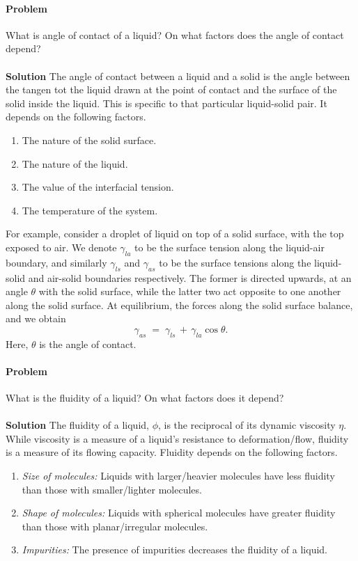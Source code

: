 \documentclass[10pt]{article}
\newcounter{prob}
\def\problem{\stepcounter{prob}\paragraph{Problem \arabic{prob}}}
\def\solution{\\\\\textbf{Solution }}
\begin{document}
        \problem What is angle of contact of a liquid? On what factors does the angle of contact depend?
        \solution The angle of contact between a liquid and a solid is the angle between the tangen tot the liquid drawn at the point of contact
        and the surface of the solid inside the liquid. This is specific to that particular liquid-solid pair. It depends on the following factors.
        \begin{enumerate}[label=(\roman*), itemsep=0pt, topsep=\parsep]
                \item The nature of the solid surface.
                \item The nature of the liquid.
                \item The value of the interfacial tension.
                \item The temperature of the system.
        \end{enumerate}
        For example, consider a droplet of liquid on top of a solid surface, with the top exposed to air. We denote $\gamma_{la}$ to be the 
        surface tension along the liquid-air boundary, and similarly $\gamma_{ls}$ and $\gamma_{as}$ to be the surface tensions along the 
        liquid-solid and air-solid boundaries respectively. The former is directed upwards, at an angle $\theta$ with the solid surface, 
        while the latter two act opposite to one another along the solid surface. At equilibrium, the forces along the solid surface balance,
        and we obtain
        \[
                \gamma_{as} \;=\; \gamma_{ls} \,+\, \gamma_{la}\cos{\theta}.
        \]
        Here, $\theta$ is the angle of contact.
        
        \problem What is the fluidity of a liquid? On what factors does it depend?
        \solution The fluidity of a liquid, $\phi$, is the reciprocal of its dynamic viscosity $\eta$. While viscosity is a measure of a liquid's
        resistance to deformation/flow, fluidity is a measure of its flowing capacity. Fluidity depends on the following factors.
        \begin{enumerate}[label=(\roman*), itemsep=0pt, topsep=\parsep]
                \item \textit{Size of molecules:} Liquids with larger/heavier molecules have less fluidity than those with smaller/lighter molecules. 
                \item \textit{Shape of molecules:} Liquids with spherical molecules have greater fluidity than those with planar/irregular molecules. 
                \item \textit{Impurities:} The presence of impurities decreases the fluidity of a liquid. 
        \end{enumerate}
\end{document}

